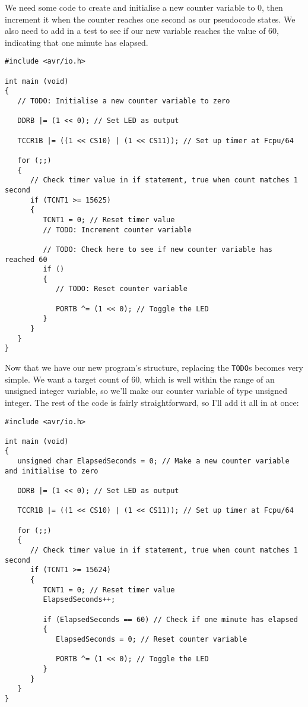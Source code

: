 \documentclass[a4paper,oneside,notitlepage]{book}
\begin{document}
We need some code to create and initialise a new counter variable to 0, then increment it when the counter reaches one second as our pseudocode states. We also need to add in a test to see if our new variable reaches the value of 60, indicating that one minute has elapsed. 

\begin{center}
\begin{lstlisting}
#include <avr/io.h>

int main (void)
{
   // TODO: Initialise a new counter variable to zero

   DDRB |= (1 << 0); // Set LED as output

   TCCR1B |= ((1 << CS10) | (1 << CS11)); // Set up timer at Fcpu/64

   for (;;)
   {
      // Check timer value in if statement, true when count matches 1 second
      if (TCNT1 >= 15625)
      {
         TCNT1 = 0; // Reset timer value
         // TODO: Increment counter variable

         // TODO: Check here to see if new counter variable has reached 60
         if ()
         {
            // TODO: Reset counter variable

            PORTB ^= (1 << 0); // Toggle the LED
         }
      }
   }
}
\end{lstlisting}
\end{center}

Now that we have our new program's structure, replacing the \texttt{TODO}s becomes very simple. We want a target count of 60, which is well within the range of an unsigned integer variable, so we'll make our counter variable of type unsigned integer. The rest of the code is fairly straightforward, so I'll add it all in at once:

\begin{center}
\begin{lstlisting}
#include <avr/io.h>

int main (void)
{
   unsigned char ElapsedSeconds = 0; // Make a new counter variable and initialise to zero

   DDRB |= (1 << 0); // Set LED as output

   TCCR1B |= ((1 << CS10) | (1 << CS11)); // Set up timer at Fcpu/64

   for (;;)
   {
      // Check timer value in if statement, true when count matches 1 second
      if (TCNT1 >= 15624)
      {
         TCNT1 = 0; // Reset timer value
         ElapsedSeconds++;

         if (ElapsedSeconds == 60) // Check if one minute has elapsed
         {
            ElapsedSeconds = 0; // Reset counter variable

            PORTB ^= (1 << 0); // Toggle the LED
         }
      }
   }
} 
\end{lstlisting}
\end{center}
\end{document}
